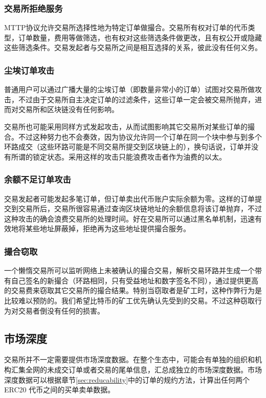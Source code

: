 \documentclass[UTF8,nofonts]{ctexart}
\begin{document}
\subsubsection{交易所拒绝服务}

MTTP协议允许交易所选择性地为特定订单做撮合。交易所有权对订单的代币类型，订单数量，费用等做筛选，也有权对这些筛选条件做更改，且有权公开或隐藏这些筛选条件。交易发起者与交易所之间是相互选择的关系，彼此没有任何义务。

\subsubsection{尘埃订单攻击}
普通用户可以通过广播大量的尘埃订单（即数量非常小的订单）试图对交易所做攻击，不过由于交易所自主决定订单的过滤条件，这些订单一定会被交易所抛弃，进而对交易所和区块链没有任何影响。

交易所也可能采用同样方式发起攻击，从而试图影响其它交易所对某些订单的撮合。不过这种努力也不会奏效，因为协议允许同一个订单在同一个块中参与到多个环路成交（这些环路可能是不同交易所提交到区块链上的），换句话说，订单并没有所谓的锁定状态。采用这样的攻击只能浪费攻击者作为油费的以太。

\subsubsection{余额不足订单攻击}

交易发起者可能发起多笔订单，但订单卖出代币账户实际余额为零。这样的订单提交到交易所后，交易所很容易通过查询区块链地址的余额信息将该订单抛弃，不过这种攻击的确会浪费交易所的处理时间。好在交易所可以通过黑名单机制，迅速有效地将某些地址屏蔽掉，拒绝再为这些地址提供撮合服务。

\subsubsection{撮合窃取}

一个懒惰交易所可以监听网络上未被确认的撮合交易，解析交易环路并生成一个带有自己签名的新撮合（环路相同，只有受益地址和数字签名不同），通过提供更高的交易费来窃取其它交易所的撮合结果。特别当窃取者是矿工时，这种作弊行为是比较难以预防的。我们希望比特币的矿工优先确认先受到的交易。不过这种窃取行为对交易者倒没有任何的损害。

\subsection{市场深度\label{sec:marketdepth}}

交易所并不一定需要提供市场深度数据。在整个生态中，可能会有单独的组织和机构汇集全网的未成交订单或者交易的尾单信息，汇总成独立的市场深度数据。市场深度数据可以根据章节\ref{sec:reducability}中的订单的规约方法，计算出任何两个ERC20 代币之间的买单卖单数据。
\end{document}
